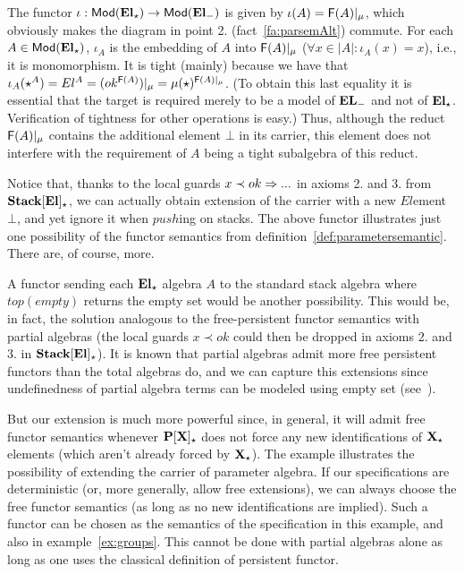 \begin{example}
The functor $\iota:{\sf {Mod}}({\bf El_\star}) \to {\sf {Mod}}({\bf El_-})$ is given by
$\iota(A)= {\sf {F}}(A)|_\mu$, which obviously makes the diagram in point
2. (fact~\ref{fa:parsemAlt}) commute. For each $A\in{\sf {Mod}}({{\bf El_\star}})$, $\iota_A$ is the embedding of $A$
into ${\sf {F}}(A)|_\mu$ ($\forall x\in|A|:\iota_A(x)=x$), i.e., it is
monomorphism. It is tight (mainly) because we have that $\iota_A(\star^A) = El^A=
(ok^{{\sf {F}}(A)})|_{\mu} = \mu(\star)^{{\sf {F}}(A)|_{\mu}}$. (To obtain this last equality it is essential
that the target is required merely to be a model of ${\bf EL_-}$ and not
of ${\bf El_\star}$. Verification of tightness for other operations is easy.) Thus, although the reduct
${{\sf {F}}(A)|_{\mu}}$ contains the additional element $\bot$ in its
carrier, this element does not interfere with the requirement of $A$ being a
tight subalgebra of this reduct.
\end{example}
%
Notice that, thanks to the local guards $x\prec ok\Rightarrow...$ in axioms 2. and
3. from ${\bf Stack[El]_\star}$, we can actually obtain extension of the
carrier with a new $El$ement $\bot$, and yet ignore it when $push$ing on
stacks. 
The above functor illustrates just one possibility of the functor semantics
from definition~\ref{def:parametersemantic}. There are, of course, more.

A functor sending each
${\bf El_\star}$ algebra $A$ to the standard stack algebra where $top(empty)$
returns the empty set would be another possibility. This would be, in fact,
the solution analogous to the free-persistent functor semantics with partial
algebras (the local guards $x\prec ok$ could then be dropped in axioms 2. and
3. in ${\bf Stack[El]_\star}$). It is known that partial algebras admit more free persistent functors
than the total algebras do, and we can capture this extensions since
undefinedness of partial algebra terms can be modeled using empty set
(see~\cite{partial}). 

But our extension is much more powerful since, in general, it will
admit free functor semantics whenever ${\bf P[X]_\star}$ does not force any new
identifications of ${\bf X}_\star$ elements (which aren't already forced by
${\bf X}_\star$). The example illustrates the possibility 
of extending the carrier of parameter algebra. If our specifications are deterministic (or, more
generally, allow free extensions), we can always choose the free functor
semantics (as long as no new identifications are implied). Such a functor can
be chosen as the semantics of the 
specification in this example, and also in example~\ref{ex:groups}. This cannot be done with partial
algebras alone as long as one uses the classical definition of persistent functor.

